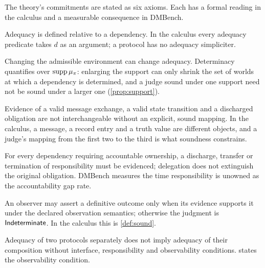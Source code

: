 The theory's commitments are stated as six axioms. Each has a formal reading in the calculus and a measurable consequence in DMBench.

\begin{axiom}
\label{ax:specificity}
Adequacy is defined relative to a dependency. In the calculus every adequacy predicate takes $d$ as an argument; a protocol has no adequacy simpliciter.
\end{axiom}

\begin{axiom}
\label{ax:assumption}
Changing the admissible environment can change adequacy. Determinacy quantifies over $\operatorname{supp}\mu_\pi$: enlarging the support can only shrink the set of worlds at which a dependency is determined, and a judge sound under one support need not be sound under a larger one (\cref{prop:support}).
\end{axiom}

\begin{axiom}
\label{ax:nonequivalence}
Evidence of a valid message exchange, a valid state transition and a discharged obligation are not interchangeable without an explicit, sound mapping. In the calculus, a message, a record entry and a truth value are different objects, and a judge's mapping from the first two to the third is what soundness constrains.
\end{axiom}

\begin{axiom}
\label{ax:continuity}
For every dependency requiring accountable ownership, a discharge, transfer or termination of responsibility must be evidenced; delegation does not extinguish the original obligation. DMBench measures the time responsibility is unowned as the accountability gap rate.
\end{axiom}

\begin{axiom}
\label{ax:evidence}
An observer may assert a definitive outcome only when its evidence supports it under the declared observation semantics; otherwise the judgment is $\mathsf{Indeterminate}$. In the calculus this is \cref{def:sound}.
\end{axiom}

\begin{axiom}
\label{ax:composition}
Adequacy of two protocols separately does not imply adequacy of their composition without interface, responsibility and observability conditions.  states the observability condition.
\end{axiom}

